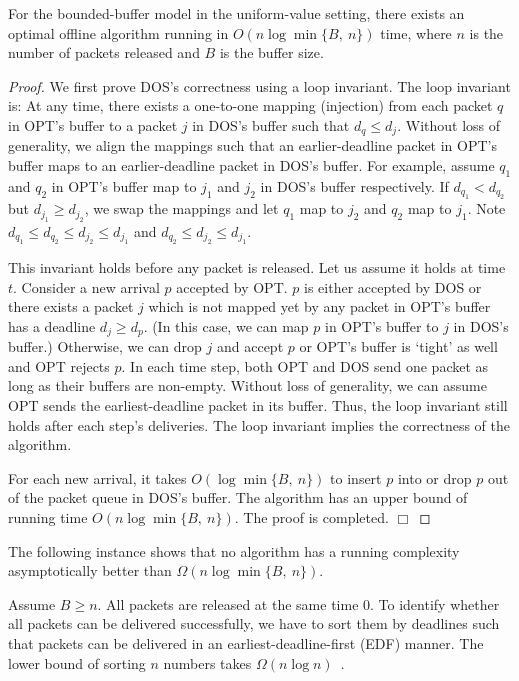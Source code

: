 \documentclass[final, 11pt]{article}
\begin{document}
\begin{Lemma}
For the bounded-buffer model in the uniform-value setting, there exists an optimal offline algorithm running in $O(n \log \min\{B, \ n\})$ time, where $n$ is the number of packets released and $B$ is the buffer size.
\label{lemma:singleoff1}
\end{Lemma}

\begin{proof}
We first prove DOS's correctness using a loop invariant. The loop invariant is: At any time, there exists a one-to-one mapping (injection) from each packet $q$ in OPT's buffer to a packet $j$ in DOS's buffer such that $d_q \le d_j$. Without loss of generality, we align the mappings such that an earlier-deadline packet in OPT's buffer maps to an earlier-deadline packet in DOS's buffer. For example, assume $q_1$ and $q_2$ in OPT's buffer map to $j_1$ and $j_2$ in DOS's buffer respectively. If $d_{q_1} < d_{q_2}$ but $d_{j_1} \ge d_{j_2}$, we swap the mappings and let $q_1$ map to $j_2$ and $q_2$ map to $j_1$. Note $d_{q_1} \le d_{q_2} \le d_{j_2} \le d_{j_1}$ and $d_{q_2} \le d_{j_2} \le d_{j_1}$.

This invariant holds before any packet is released. Let us assume it holds at time $t$. Consider a new arrival $p$ accepted by OPT. $p$ is either accepted by DOS or there exists a packet $j$ which is not mapped yet by any packet in OPT's buffer has a deadline $d_j \ge d_p$. (In this case, we can map $p$ in OPT's buffer to $j$ in DOS's buffer.) Otherwise, we can drop $j$ and accept $p$ or OPT's buffer is `tight' as well and OPT rejects $p$. In each time step, both OPT and DOS send one packet as long as their buffers are non-empty. Without loss of generality, we can assume OPT sends the earliest-deadline packet in its buffer. Thus, the loop invariant still holds after each step's deliveries. The loop invariant implies the correctness of the algorithm.

For each new arrival, it takes $O(\log \min\{B, \ n\})$ to insert $p$ into or drop $p$ out of the packet queue in DOS's buffer. The algorithm has an upper bound of running time $O(n \log \min\{B, \ n\})$. The proof is completed. $\Box$
\end{proof}

The following instance shows that no algorithm has a running complexity asymptotically better than $\Omega(n \log \min\{B, \ n\})$.

\begin{Example}
Assume $B \ge n$. All packets are released at the same time $0$. To identify whether all packets can be delivered successfully, we have to sort them by deadlines such that packets can be delivered in an earliest-deadline-first (EDF) manner. The lower bound of sorting $n$ numbers takes $\Omega(n \log n)$~\cite{CLRS01}.
\end{Example}
\end{document}
